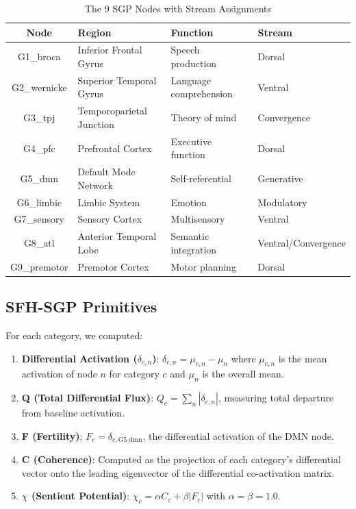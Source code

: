 \documentclass[12pt]{article}
\numberwithin{equation}{section}
\begin{document}
\begin{table}[htbp]
	\centering
	\caption{The 9 SGP Nodes with Stream Assignments}
	\label{tab:nodes}
	\begin{tabular}{clll}
		\toprule
		Node         & Region                   & Function               & Stream              \\
		\midrule
		G1\_broca    & Inferior Frontal Gyrus   & Speech production      & Dorsal              \\
		G2\_wernicke & Superior Temporal Gyrus  & Language comprehension & Ventral             \\
		G3\_tpj      & Temporoparietal Junction & Theory of mind         & Convergence         \\
		G4\_pfc      & Prefrontal Cortex        & Executive function     & Dorsal              \\
		G5\_dmn      & Default Mode Network     & Self-referential       & Generative          \\
		G6\_limbic   & Limbic System            & Emotion                & Modulatory          \\
		G7\_sensory  & Sensory Cortex           & Multisensory           & Ventral             \\
		G8\_atl      & Anterior Temporal Lobe   & Semantic integration   & Ventral/Convergence \\
		G9\_premotor & Premotor Cortex          & Motor planning         & Dorsal              \\
		\bottomrule
	\end{tabular}
\end{table}

\subsection{SFH-SGP Primitives}

For each category, we computed:

\begin{enumerate}
	\item \textbf{Differential Activation ($\delta_{c,n}$)}: $\delta_{c,n} = \mu_{c,n} - \mu_n$ where $\mu_{c,n}$ is the mean activation of node $n$ for category $c$ and $\mu_n$ is the overall mean.

	\item \textbf{Q (Total Differential Flux)}: $Q_c = \sum_n |\delta_{c,n}|$, measuring total departure from baseline activation.

	\item \textbf{F (Fertility)}: $F_c = \delta_{c,\text{G5\_dmn}}$, the differential activation of the DMN node.

	\item \textbf{C (Coherence)}: Computed as the projection of each category's differential vector onto the leading eigenvector of the differential co-activation matrix.

	\item \textbf{$\chi$ (Sentient Potential)}: $\chi_c = \alpha C_c + \beta |F_c|$ with $\alpha = \beta = 1.0$.
\end{enumerate}
\end{document}
